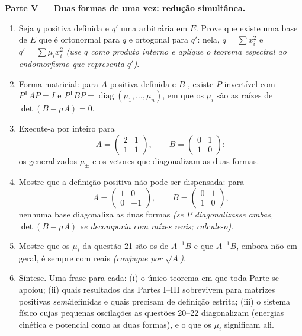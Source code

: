 \begin{problem}
\medskip
\noindent\textbf{Parte V --- Duas formas de uma vez: redução
simultânea.}
\begin{enumerate}[resume]
  \item Seja $q$ positiva definida e $q'$ uma
         arbitrária em $E$. Prove que existe uma base de
        $E$ que é ortonormal para $q$ e ortogonal para
        $q'$: nela, $q = \sum x_i^2$ e $q' = \sum \mu_i
        x_i^2$ \emph{(use $q$ como produto interno e aplique
        o teorema espectral ao endomorfismo que representa
        $q'$)}.
  \item Forma matricial: para $A$ positiva definida e $B$
        , existe $P$ invertível com
        $P^{\mathsf T}AP = I$ e $P^{\mathsf T}BP =
        \operatorname{diag}(\mu_1, \dots, \mu_n)$, em que os
        $\mu_i$ são as raízes de $\det(B - \mu A) = 0$.
  \item Execute-a por inteiro para
        \[
        A = \begin{pmatrix} 2 & 1\\ 1 & 1 \end{pmatrix},
        \qquad
        B = \begin{pmatrix} 0 & 1\\ 1 & 0 \end{pmatrix} :
        \]
        os  generalizados $\mu_\pm$ e os vetores
        que diagonalizam as duas formas.
  \item Mostre que a definição positiva não pode ser dispensada: para
        \[
        A = \begin{pmatrix} 1 & 0\\ 0 & -1 \end{pmatrix},
        \qquad
        B = \begin{pmatrix} 0 & 1\\ 1 & 0 \end{pmatrix},
        \]
        nenhuma base diagonaliza as duas formas \emph{(se $P$
        diagonalizasse ambas, $\det(B - \mu A)$ se decomporia com
        raízes reais; calcule-o)}.
  \item Mostre que os $\mu_i$ da questão 21 são os
         de $A^{-1}B$ e que $A^{-1}B$, embora não
         em geral, é sempre  com
         reais \emph{(conjugue por $\sqrt A$)}.
  \item Síntese. Uma frase para cada: (i) o único teorema
        em que toda Parte se apoiou; (ii) quais resultados das Partes
        I--III sobrevivem para matrizes positivas \emph{semi}definidas
        e quais precisam de definição estrita; (iii) o
        sistema físico cujas pequenas oscilações as questões
        20--22 diagonalizam (energias cinética e potencial como
        as duas formas), e o que os $\mu_i$ significam ali.
\end{enumerate}
\end{problem}
